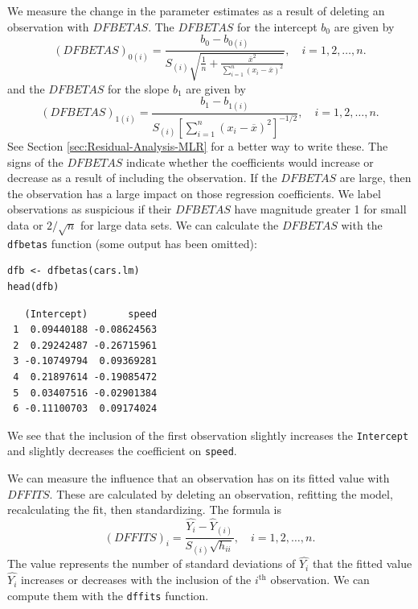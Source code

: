 \documentclass[captions=tableheading]{scrbook}
\begin{document}
We measure the change in the parameter estimates as a result of deleting an observation with \(DFBETAS\). The \(DFBETAS\) for the intercept \(b_{0}\) are given by
\begin{equation}
(DFBETAS)_{0(i)}=\frac{b_{0}-b_{0(i)}}{S_{(i)}\sqrt{\frac{1}{n}+\frac{\overline{x}^{2}}{\sum_{i=1}^{n}(x_{i}-\overline{x})^{2}}}},\quad i=1,2,\ldots,n.
\end{equation}
and the \(DFBETAS\) for the slope \(b_{1}\) are given by
\begin{equation}
(DFBETAS)_{1(i)}=\frac{b_{1}-b_{1(i)}}{S_{(i)}\left[\sum_{i=1}^{n}(x_{i}-\overline{x})^{2}\right]^{-1/2}},\quad i=1,2,\ldots,n.
\end{equation}
See Section \ref{sec:Residual-Analysis-MLR} for a better way to write these. The signs of the \(DFBETAS\) indicate whether the coefficients would increase or decrease as a result of including the observation. If the \(DFBETAS\) are large, then the observation has a large impact on those regression coefficients. We label observations as suspicious if their \(DFBETAS\) have magnitude greater 1 for small data or \(2/\sqrt{n}\) for large data sets.
We can calculate the \(DFBETAS\) with the \texttt{dfbetas} function (some output has been omitted):


\begin{verbatim}
dfb <- dfbetas(cars.lm)
head(dfb)
\end{verbatim}

\begin{verbatim}
   (Intercept)       speed
 1  0.09440188 -0.08624563
 2  0.29242487 -0.26715961
 3 -0.10749794  0.09369281
 4  0.21897614 -0.19085472
 5  0.03407516 -0.02901384
 6 -0.11100703  0.09174024
\end{verbatim}

We see that the inclusion of the first observation slightly increases the \texttt{Intercept} and slightly decreases the coefficient on \texttt{speed}.

We can measure the influence that an observation has on its fitted value with \(DFFITS\). These are calculated by deleting an observation, refitting the model, recalculating the fit, then standardizing. The formula is 
\begin{equation}
(DFFITS)_{i}=\frac{\hat{Y_{i}}-\hat{Y}_{(i)}}{S_{(i)}\sqrt{h_{ii}}},\quad i=1,2,\ldots,n.
\end{equation}
The value represents the number of standard deviations of \(\hat{Y_{i}}\) that the fitted value \(\hat{Y_{i}}\) increases or decreases with the inclusion of the \(i^{\textrm{th}}\) observation. We can compute them with the \texttt{dffits} function.
\end{document}
